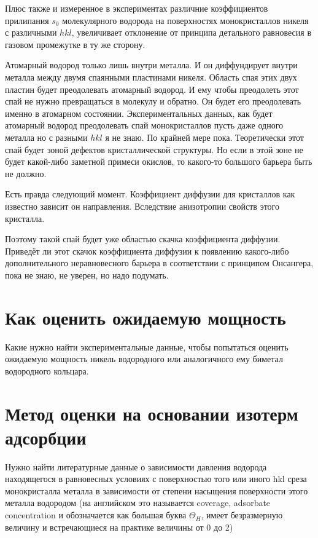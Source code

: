 \documentclass[11pt]{article}
\begin{document}
Плюс также и измеренное в экспериментах различние коэффициентов
прилипания \(s_0\) молекулярного водорода на поверхностях монокристаллов
никеля с различными \(hkl\), увеличивает отклонение от принципа
детального равновесия в газовом промежутке в ту же сторону.

Атомарный водород только лишь внутри металла. И он диффундирует внутри
металла между двумя спаянными пластинами никеля. Область спая этих двух
пластин будет преодолевать атомарный водород. И ему чтобы преодолеть
этот спай не нужно превращаться в молекулу и обратно. Он будет его
преодолевать именно в атомарном состоянии. Экспериментальных данных, как
будет атомарный водород преодолевать спай монокристаллов пусть даже
одного металла но с разными \(hkl\) я не знаю. По крайней мере пока.
Теоретически этот спай будет зоной дефектов кристаллической структуры.
Но если в этой зоне не будет какой-либо заметной примеси окислов, то
какого-то большого барьера быть не должно.

Есть правда следующий момент. Коэффициент диффузии для кристаллов как
известно зависит он направления. Вследствие анизотропии свойств этого
кристалла.

Поэтому такой спай будет уже областью скачка коэффициента диффузии.
Приведёт ли этот скачок коэффициента диффузии к появлению какого-либо
дополнительного неравновесного барьера в соответствии с принципом
Онсангера, пока не знаю, не уверен, но надо подумать.

    \section{Как оценить ожидаемую
мощность}\label{ux43aux430ux43a-ux43eux446ux435ux43dux438ux442ux44c-ux43eux436ux438ux434ux430ux435ux43cux443ux44e-ux43cux43eux449ux43dux43eux441ux442ux44c}

Какие нужно найти экспериментальные данные, чтобы попытаться оценить
ожидаемую мощность никель водородного или аналогичного ему биметал
водородного кольцара.

    \section{Метод оценки на основании изотерм
адсорбции}\label{ux43cux435ux442ux43eux434-ux43eux446ux435ux43dux43aux438-ux43dux430-ux43eux441ux43dux43eux432ux430ux43dux438ux438-ux438ux437ux43eux442ux435ux440ux43c-ux430ux434ux441ux43eux440ux431ux446ux438ux438}

    Нужно найти литературные данные о зависимости давления водорода
находящегося в равновесных условиях с поверхностью того или иного hkl
среза монокристалла металла в зависимости от степени насыщения
поверхности этого металла водородом (на английском это называется
coverage, adsorbate concentration и обозначается как большая буква
\(\Theta_H\), имеет безразмерную величину и встречающиеся на практике
величины от 0 до 2)
\end{document}
